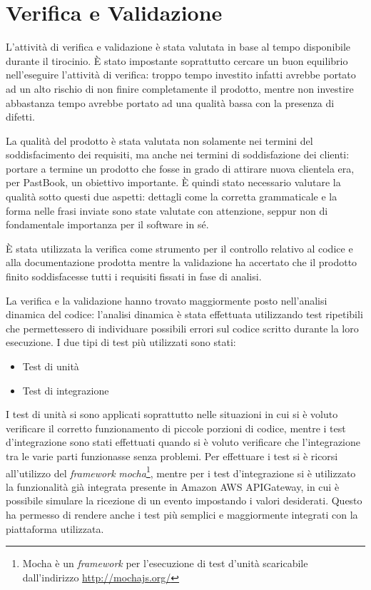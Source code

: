 

\chapter{Verifica e Validazione}

L'attività di verifica e validazione è stata valutata in base al tempo
disponibile durante il tirocinio. È stato impostante soprattutto cercare un
buon equilibrio nell'eseguire l'attività di verifica: troppo tempo investito
infatti avrebbe portato ad un alto rischio di non finire completamente il
prodotto, mentre non investire abbastanza tempo avrebbe portato ad una qualità
bassa con la presenza di difetti.

La qualità del prodotto è stata valutata non solamente nei termini del
soddisfacimento dei requisiti, ma anche nei termini di soddisfazione dei
clienti: portare a termine un prodotto che fosse in grado di attirare nuova
clientela era, per PastBook, un obiettivo importante. È quindi stato necessario
valutare la qualità sotto questi due aspetti: dettagli come la corretta
grammaticale e la forma nelle frasi inviate sono state valutate con attenzione,
seppur non di fondamentale importanza per il software in sé.

È stata utilizzata la verifica come strumento per il controllo relativo
al codice e alla documentazione prodotta mentre la validazione ha accertato
che il prodotto finito soddisfacesse tutti i requisiti fissati in fase di
analisi.

La verifica e la validazione hanno trovato maggiormente posto nell'analisi
dinamica del codice: l'analisi dinamica è stata effettuata utilizzando test
ripetibili che permettessero di individuare possibili errori sul codice
scritto durante la loro esecuzione.
I due tipi di test più utilizzati sono stati:
\begin{itemize}
  \item Test di unità
  \item Test di integrazione
\end{itemize}
I test di unità si sono applicati soprattutto nelle situazioni in cui si è
voluto verificare il corretto funzionamento di piccole porzioni di codice,
mentre i test d'integrazione sono stati effettuati quando si è voluto
verificare che l'integrazione tra le varie parti funzionasse senza problemi.
Per effettuare i test si è ricorsi all'utilizzo del \textit{framework}
\textit{mocha}\footnote{Mocha è un \textit{framework} per l'esecuzione di test
d'unità scaricabile dall'indirizzo \url{http://mochajs.org/}}, mentre per i
test d'integrazione si è utilizzato la funzionalità già integrata presente in
Amazon AWS APIGateway, in cui è possibile simulare la ricezione di un evento
impostando i valori desiderati. Questo ha permesso di rendere anche i test più
semplici e maggiormente integrati con la piattaforma utilizzata.

